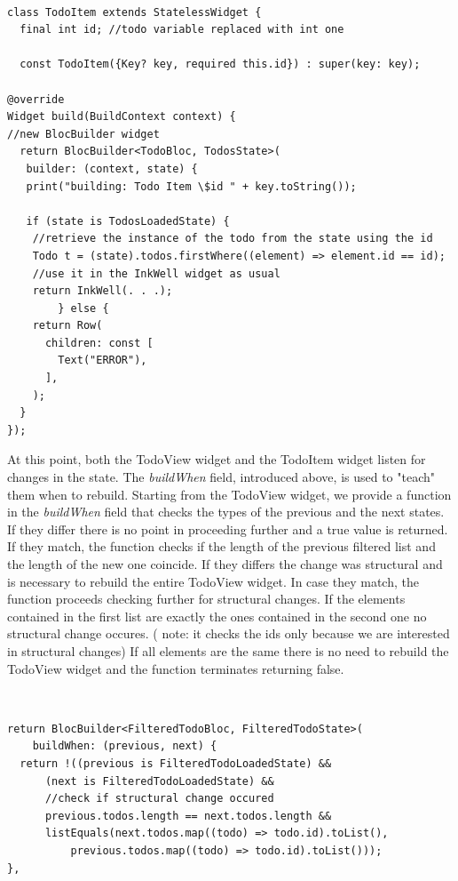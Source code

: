 \begin{code}
\mbox{}\\
 \mbox{}
\label{code:2.14}
\begin{verbatim}
class TodoItem extends StatelessWidget {
  final int id; //todo variable replaced with int one

  const TodoItem({Key? key, required this.id}) : super(key: key);

@override
Widget build(BuildContext context) {
//new BlocBuilder widget
  return BlocBuilder<TodoBloc, TodosState>(
   builder: (context, state) {
   print("building: Todo Item \$id " + key.toString());

   if (state is TodosLoadedState) {
    //retrieve the instance of the todo from the state using the id
    Todo t = (state).todos.firstWhere((element) => element.id == id);
    //use it in the InkWell widget as usual
    return InkWell(. . .);
        } else {
    return Row(
      children: const [
        Text("ERROR"),
      ],
    );
  }
});
\end{verbatim}
\mbox{}
\end{code}

At this point, both the TodoView widget and the TodoItem widget listen for changes in the state. The \textit{buildWhen} field, introduced above,  is used to "teach" them when to rebuild. Starting from the TodoView widget, we provide a function in the \textit{buildWhen} field that checks the types of the previous and the next states. If they differ there is no point in proceeding further and a true value is returned. If they match, the function checks if the length of the previous filtered list and the length of the new one coincide. If they differs the change was structural and is necessary to rebuild the entire TodoView widget. In case they match, the function proceeds checking further for structural changes. If the elements contained in the first list are exactly the ones contained in the second one no structural change occures. ( note: it checks the ids only because we are interested in structural changes) If all elements are the same there is no need to rebuild the TodoView widget and the function terminates returning false.
\begin{code}
\mbox{}\\
 \mbox{}
\label{code:2.14}
\begin{verbatim}
return BlocBuilder<FilteredTodoBloc, FilteredTodoState>(
    buildWhen: (previous, next) {
  return !((previous is FilteredTodoLoadedState) &&
      (next is FilteredTodoLoadedState) &&
      //check if structural change occured
      previous.todos.length == next.todos.length &&
      listEquals(next.todos.map((todo) => todo.id).toList(),
          previous.todos.map((todo) => todo.id).toList()));
},
\end{verbatim}
\mbox{}
\end{code}

